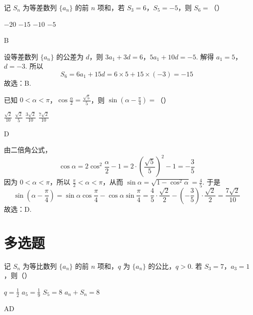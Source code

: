 \begin{problem}
记 \(S_n\) 为等差数列 \(\{a_n\}\) 的前 \(n\) 项和，若 \(S_3=6\)，\(S_5=-5\)，则 \(S_6=\)（\quad）

\choices
    {\(-20\)}
    {\(-15\)}
    {\(-10\)}
    {\(-5\)}
\end{problem}

\begin{answer}
B
\end{answer}

\begin{solution}
设等差数列 \(\{a_n\}\) 的公差为 \(d\)，则 \(3a_1+3d=6\)，\(5a_1+10d=-5\).
解得 \(a_1=5\)，\(d=-3\). 所以
\[
S_6=6a_1+15d=6\times 5+15\times(-3)=-15
\]
故选：B.
\end{solution}

\begin{problem}
已知 \(0<\alpha<\pi\)，\(\cos \frac{\alpha}{2}=\frac{\sqrt5}{5}\)，则 \(\sin\left(\alpha-\frac{\pi}{4}\right)=\)（\quad）

\choices
    {\(\frac{\sqrt2}{10}\)}
    {\(\frac{\sqrt2}{5}\)}
    {\(\frac{3\sqrt2}{10}\)}
    {\(\frac{7\sqrt2}{10}\)}
\end{problem}

\begin{answer}
D
\end{answer}

\begin{solution}
由二倍角公式，
\[
\cos\alpha=2\cos^2\frac{\alpha}{2}-1
=2\cdot\left(\frac{\sqrt5}{5}\right)^2-1
=-\frac35
\]
因为 \(0<\alpha<\pi\)，所以 \(\frac{\pi}{2}<\alpha<\pi\)，从而
\(\sin\alpha=\sqrt{1-\cos^2\alpha}=\frac45\).
于是
\[
\sin\left(\alpha-\frac{\pi}{4}\right)
=\sin\alpha\cos\frac{\pi}{4}-\cos\alpha\sin\frac{\pi}{4}
=\frac45\cdot\frac{\sqrt2}{2}-\left(-\frac35\right)\cdot\frac{\sqrt2}{2}
=\frac{7\sqrt2}{10}
\]
故选：D.
\end{solution}
\section{多选题}

\begin{problem}
记 \(S_n\) 为等比数列 \(\{a_n\}\) 的前 \(n\) 项和，\(q\) 为 \(\{a_n\}\) 的公比，\(q>0\). 若 \(S_3=7\)，\(a_3=1\)，则（\quad）

\choices
    {\(q=\frac12\)}
    {\(a_5=\frac19\)}
    {\(S_5=8\)}
    {\(a_n+S_n=8\)}
\end{problem}

\begin{answer}
AD
\end{answer}

